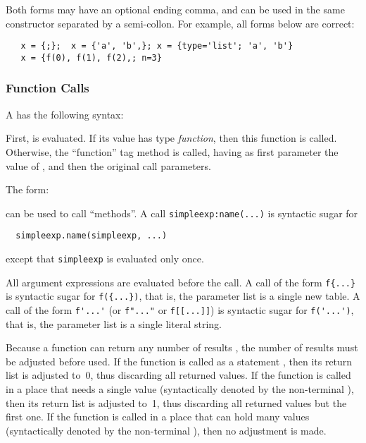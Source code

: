 Both forms may have an optional ending comma,
and can be used in the same constructor separated by
a semi-collon.
For example, all forms below are correct:
\begin{verbatim}
   x = {;};  x = {'a', 'b',}; x = {type='list'; 'a', 'b'}
   x = {f(0), f(1), f(2),; n=3}
\end{verbatim}

\subsubsection{Function Calls}  \label{functioncall}
A  has the following syntax:
\begin{Produc}
\end{Produc}%
First,  is evaluated.
If its value has type \emph{function},
then this function is called.
Otherwise, the ``function'' tag method is called,
having as first parameter the value of ,
and then the original call parameters.

The form:
\begin{Produc}
\end{Produc}%
can be used to call ``methods''.
A call \verb|simpleexp:name(...)|
is syntactic sugar for
\begin{verbatim}
  simpleexp.name(simpleexp, ...)
\end{verbatim}
except that \verb|simpleexp| is evaluated only once.

\begin{Produc}
\end{Produc}%
All argument expressions are evaluated before the call.
A call of the form \verb|f{...}| is syntactic sugar for
\verb|f({...})|, that is,
the parameter list is a single new table.
A call of the form \verb|f'...'|
(or \verb|f"..."| or \verb|f[[...]]|) is syntactic sugar for
\verb|f('...')|, that is,
the parameter list is a single literal string.

Because a function can return any number of results
,
the number of results must be adjusted before used.
If the function is called as a statement ,
then its return list is adjusted to~0,
thus discarding all returned values.
If the function is called in a place that needs a single value
(syntactically denoted by the non-terminal ),
then its return list is adjusted to~1,
thus discarding all returned values but the first one.
If the function is called in a place that can hold many values
(syntactically denoted by the non-terminal ),
then no adjustment is made.

